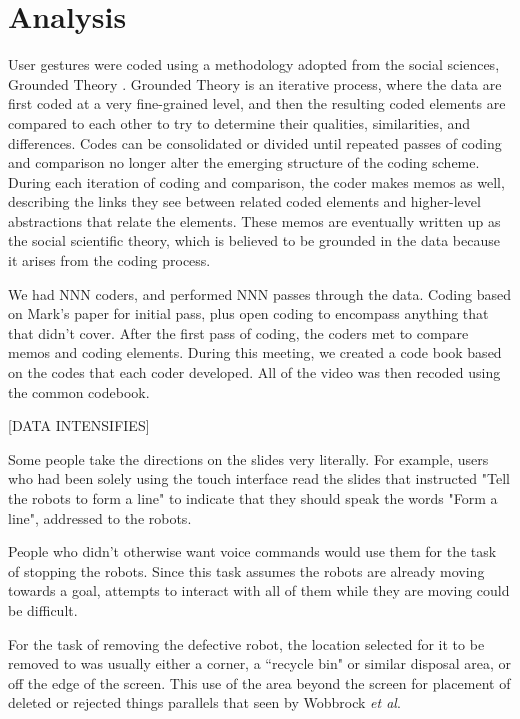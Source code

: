 \documentclass[]{article}
\begin{document}
\section{Analysis}

User gestures were coded using a methodology adopted from the social sciences, Grounded Theory .
Grounded Theory is an iterative process, where the data are first coded at a very fine-grained level, and then the resulting coded elements are compared to each other to try to determine their qualities, similarities, and differences. 
Codes can be consolidated or divided until repeated passes of coding and comparison no longer alter the emerging structure of the coding scheme. 
During each iteration of coding and comparison, the coder makes memos as well, describing the links they see between related coded elements and higher-level abstractions that relate the elements. 
These memos are eventually written up as the social scientific theory, which is believed to be grounded in the data because it arises from the coding process. 

We had NNN coders, and performed NNN  passes through the data.
Coding based on Mark's paper for initial pass, plus open coding to encompass anything that that didn't cover. 
After the first pass of coding, the coders met to compare memos and coding elements. During this meeting, we created a code book based on the codes that each coder developed. All of the video was then recoded using the common codebook. 



[DATA INTENSIFIES]
 
Some people take the directions on the slides very literally. 
For example, users who had been solely using the touch interface read the slides that instructed "Tell the robots to form a line" to indicate that they should speak the words "Form a line", addressed to the robots.

People who didn't otherwise want voice commands would use them for the task of stopping the robots. 
Since this task assumes the robots are already moving towards a goal, attempts to interact with all of them while they are moving could be difficult. 

For the task of removing the defective robot, the location selected for it to be removed to was usually either a corner, a ``recycle bin" or similar disposal area, or off the edge of the screen. This use of the area beyond the screen for placement of deleted or rejected things parallels that seen by Wobbrock \textit{et al}.
\end{document}
